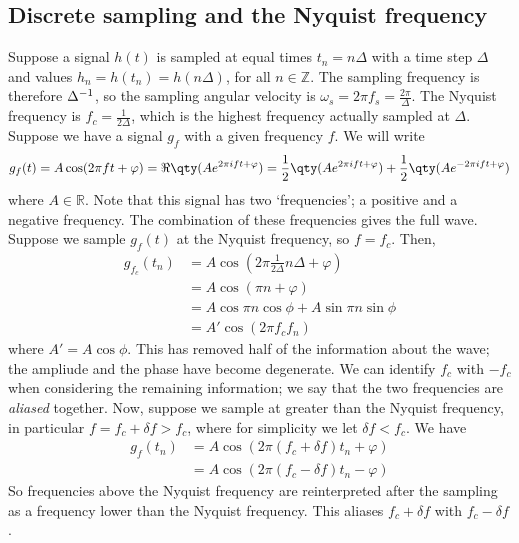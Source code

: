 \subsection{Discrete sampling and the Nyquist frequency}
Suppose a signal $h(t)$ is sampled at equal times $t_n = n\Delta$ with a time step $\Delta$ and values $h_n = h(t_n) = h(n\Delta)$, for all $n \in \mathbb Z$.
The sampling frequency is therefore $\Delta^{-1}$, so the sampling angular velocity is $\omega_s = 2\pi f_s = \frac{2\pi}{\Delta}$.
The Nyquist frequency is $f_c = \frac{1}{2\Delta}$, which is the highest frequency actually sampled at $\Delta$.
Suppose we have a signal $g_f$ with a given frequency $f$.
We will write
\begin{align*}
	g_f(t) = A \cos(2\pi f t + \varphi) = \Re \qty(A e^{2 \pi i f t + \varphi}) = \frac{1}{2} \qty(A e^{2 \pi i f t + \varphi}) + \frac{1}{2} \qty(A e^{-2 \pi i f t + \varphi})
\end{align*}
where $A \in \mathbb R$.
Note that this signal has two `frequencies'; a positive and a negative frequency.
The combination of these frequencies gives the full wave.
Suppose we sample $g_f(t)$ at the Nyquist frequency, so $f = f_c$.
Then,
\begin{align*}
	g_{f_c}(t_n) & = A \cos(2 \pi \frac{1}{2\Delta} n \Delta + \varphi) \\
	             & = A \cos(\pi n + \varphi)                            \\
	             & = A \cos \pi n \cos \phi + A \sin \pi n \sin \phi    \\
	             & = A' \cos(2\pi f_c f_n)
\end{align*}
where $A' = A \cos \phi$.
This has removed half of the information about the wave; the ampliude and the phase have become degenerate.
We can identify $f_c$ with $-f_c$ when considering the remaining information; we say that the two frequencies are \textit{aliased} together.
Now, suppose we sample at greater than the Nyquist frequency, in particular $f = f_c + \delta f > f_c$, where for simplicity we let $\delta f < f_c$.
We have
\begin{align*}
	g_f(t_n) & = A \cos(2\pi (f_c + \delta f)t_n + \varphi) \\
	         & = A \cos(2\pi (f_c - \delta f)t_n - \varphi)
\end{align*}
So frequencies above the Nyquist frequency are reinterpreted after the sampling as a frequency lower than the Nyquist frequency.
This aliases $f_c + \delta f$ with $f_c - \delta f$.


